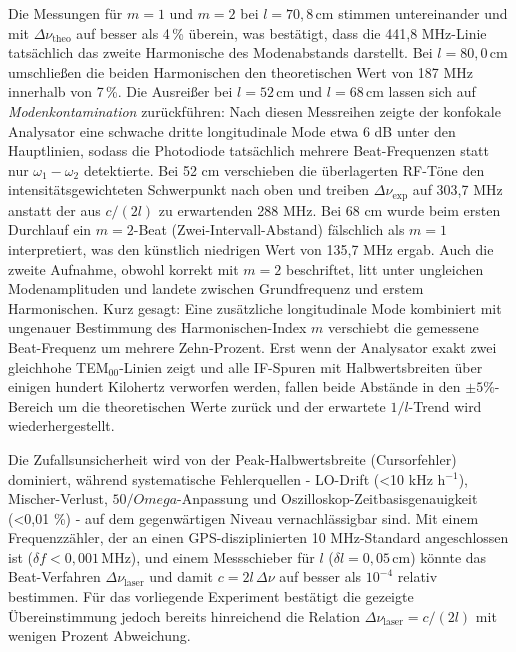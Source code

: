 Die Messungen für $m=1$ und $m=2$ bei $l=70{,}8\,\mathrm{cm}$ stimmen untereinander und mit $\Delta\nu_{\mathrm{theo}}$ auf besser als 4\,\% überein, was bestätigt, dass die 441{,}8 MHz-Linie tatsächlich das zweite Harmonische des Modenabstands darstellt. Bei $l=80{,}0\,\mathrm{cm}$ umschließen die beiden Harmonischen den theoretischen Wert von 187 MHz innerhalb von 7\,\%.  
Die Ausreißer bei $l = 52\,\si{\centi\meter}$ und $l = 68\,\si{\centi\meter}$ lassen sich auf \emph{Modenkontamination} zurückführen: Nach diesen Messreihen zeigte der konfokale Analysator eine schwache dritte longitudinale Mode etwa 6 dB unter den Hauptlinien, sodass die Photodiode tatsächlich mehrere Beat-Frequenzen statt nur $\omega_{1} - \omega_{2}$ detektierte. Bei 52 cm verschieben die überlagerten RF-Töne den intensitätsgewichteten Schwerpunkt nach oben und treiben $\Delta\nu_{\mathrm{exp}}$ auf 303,7 MHz anstatt der aus $c/(2l)$ zu erwartenden 288 MHz. Bei 68 cm wurde beim ersten Durchlauf ein $m=2$-Beat (Zwei-Intervall-Abstand) fälschlich als $m=1$ interpretiert, was den künstlich niedrigen Wert von 135,7 MHz ergab. Auch die zweite Aufnahme, obwohl korrekt mit $m=2$ beschriftet, litt unter ungleichen Modenamplituden und landete zwischen Grundfrequenz und erstem Harmonischen. Kurz gesagt: Eine zusätzliche longitudinale Mode kombiniert mit ungenauer Bestimmung des Harmonischen-Index $m$ verschiebt die gemessene Beat-Frequenz um mehrere Zehn-Prozent. Erst wenn der Analysator exakt zwei gleichhohe TEM$_{00}$-Linien zeigt und alle IF-Spuren mit Halbwertsbreiten über einigen hundert Kilohertz verworfen werden, fallen beide Abstände in den $\pm5\%$-Bereich um die theoretischen Werte zurück und der erwartete $1/l$-Trend wird wiederhergestellt.


Die Zufallsunsicherheit wird von der Peak-Halbwertsbreite (Cursorfehler) dominiert, während systematische Fehlerquellen - LO-Drift (<10 kHz h$^{-1}$), Mischer-Verlust, $50 /Omega$-Anpassung und Oszilloskop-Zeitbasisgenauigkeit (<0{,}01 \%) - auf dem gegenwärtigen Niveau vernachlässigbar sind. Mit einem Frequenzzähler, der an einen GPS-disziplinierten 10 MHz-Standard angeschlossen ist ($\delta f<0{,}001\,\mathrm{MHz}$), und einem Messschieber für $l$ ($\delta l=0{,}05\,\mathrm{cm}$) könnte das Beat-Verfahren $\Delta\nu_{\mathrm{laser}}$ und damit $c=2l\,\Delta\nu$ auf besser als $10^{-4}$ relativ bestimmen. Für das vorliegende Experiment bestätigt die gezeigte Übereinstimmung jedoch bereits hinreichend die Relation $\Delta\nu_{\mathrm{laser}} = c/(2l)$ mit wenigen Prozent Abweichung.


